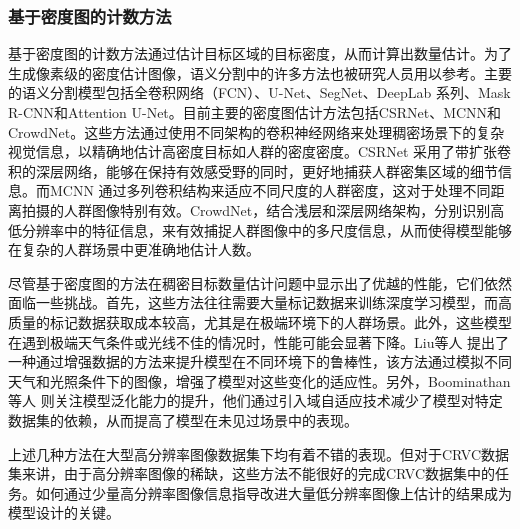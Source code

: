 \subsubsection{基于密度图的计数方法}
基于密度图的计数方法通过估计目标区域的目标密度，从而计算出数量估计。为了生成像素级的密度估计图像，语义分割中的许多方法也被研究人员用以参考。主要的语义分割模型包括全卷积网络（FCN）\cite{2015FullyConvolutionalNetworksSemanticSegmentation}、U-Net\cite{ronnebergerUNetConvolutionalNetworks2015}、SegNet\cite{2016SegNetDeepConvolutionalEncoderDecoderArchitectureImageSegmentation}、DeepLab\cite{2016SemanticImageSegmentationDeepConvolutionalNetsFullyConnectedCRFs} \cite{2017DeepLabSemanticImageSegmentationDeepConvolutionalNetsAtrousConvolutionFullyConnectedCRFs}\cite{2017RethinkingAtrousConvolutionSemanticImageSegmentation}系列、Mask R-CNN\cite{2018MaskRCNN}和Attention U-Net\cite{oktayAttentionUNetLearning2018}。目前主要的密度图估计方法包括CSRNet\cite{2018CSRNetDilatedConvolutionalNeuralNetworksUnderstandingHighlyCongestedScenesa}、MCNN\cite{2016SingleImageCrowdCountingMultiColumnConvolutionalNeuralNetwork}和CrowdNet\cite{2016CrowdNetDeepConvolutionalNetworkDenseCrowdCounting}。这些方法通过使用不同架构的卷积神经网络来处理稠密场景下的复杂视觉信息，以精确地估计高密度目标如人群的密度密度。CSRNet 采用了带扩张卷积的深层网络，能够在保持有效感受野的同时，更好地捕获人群密集区域的细节信息。而MCNN 通过多列卷积结构来适应不同尺度的人群密度，这对于处理不同距离拍摄的人群图像特别有效。CrowdNet，结合浅层和深层网络架构，分别识别高低分辨率中的特征信息，来有效捕捉人群图像中的多尺度信息，从而使得模型能够在复杂的人群场景中更准确地估计人数。

尽管基于密度图的方法在稠密目标数量估计问题中显示出了优越的性能，它们依然面临一些挑战。首先，这些方法往往需要大量标记数据来训练深度学习模型，而高质量的标记数据获取成本较高，尤其是在极端环境下的人群场景。此外，这些模型在遇到极端天气条件或光线不佳的情况时，性能可能会显著下降。Liu等人\cite{2018CrowdCountingusingDeepRecurrentSpatialAwareNetwork} 提出了一种通过增强数据的方法来提升模型在不同环境下的鲁棒性，该方法通过模拟不同天气和光照条件下的图像，增强了模型对这些变化的适应性。另外，Boominathan 等人\cite{2016CrowdNetDeepConvolutionalNetworkDenseCrowdCounting} 则关注模型泛化能力的提升，他们通过引入域自适应技术减少了模型对特定数据集的依赖，从而提高了模型在未见过场景中的表现。

上述几种方法在大型高分辨率图像数据集下均有着不错的表现。但对于CRVC数据集来讲，由于高分辨率图像的稀缺，这些方法不能很好的完成CRVC数据集中的任务。如何通过少量高分辨率图像信息指导改进大量低分辨率图像上估计的结果成为模型设计的关键。

